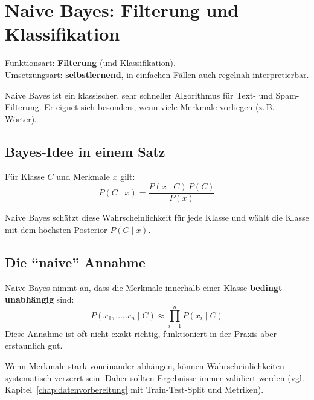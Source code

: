 \chapter{Naive Bayes: Filterung und Klassifikation}
\label{chap:naivebayes}

\begin{myremark}
Funktionsart: \textbf{Filterung} (und Klassifikation). \\
Umsetzungsart: \textbf{selbstlernend}, in einfachen Fällen auch regelnah interpretierbar.
\end{myremark}

\begin{myremark}
Naive Bayes ist ein klassischer,
sehr schneller Algorithmus für Text- und Spam-Filterung.
Er eignet sich besonders, wenn viele Merkmale vorliegen (z.\,B. Wörter).
\end{myremark}

\section{Bayes-Idee in einem Satz}

\begin{mydefinition}
Für Klasse $C$ und Merkmale $x$ gilt:
\[
P(C\mid x)=\frac{P(x\mid C)\,P(C)}{P(x)}
\]

Naive Bayes schätzt diese Wahrscheinlichkeit für jede Klasse und wählt
die Klasse mit dem höchsten Posterior $P(C\mid x)$.
\end{mydefinition}

\section{Die \enquote{naive} Annahme}

\begin{mydefinition}
Naive Bayes nimmt an, dass die Merkmale innerhalb einer Klasse
\textbf{bedingt unabhängig} sind:
\[
P(x_1,\ldots,x_n\mid C) \approx \prod_{i=1}^n P(x_i\mid C)
\]
Diese Annahme ist oft nicht exakt richtig, funktioniert in der Praxis
aber erstaunlich gut.
\end{mydefinition}

\begin{mycaution}
Wenn Merkmale stark voneinander abhängen, können Wahrscheinlichkeiten
systematisch verzerrt sein. Daher sollten Ergebnisse immer validiert werden
(vgl. Kapitel~\cref{chap:datenvorbereitung} mit Train-Test-Split und Metriken).
\end{mycaution}

